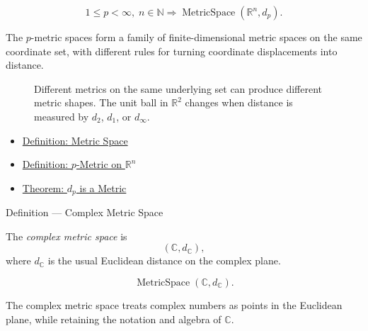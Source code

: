 \begin{remark*}
\[
1\leq p<\infty,\; n\in\mathbb{N}
\Longrightarrow
\operatorname{MetricSpace}(\mathbb{R}^n,d_p).
\]
\end{remark*}

\begin{remark*}[Interpretation]
The \(p\)-metric spaces form a family of finite-dimensional metric spaces on
the same coordinate set, with different rules for turning coordinate
displacements into distance.
\end{remark*}

\begin{figure}[htbp]
\centering

\caption{Different metrics on the same underlying set can produce different
metric shapes.  The unit ball in \(\mathbb{R}^2\) changes when distance is
measured by \(d_2\), \(d_1\), or \(d_\infty\).}
\label{fig:metric-unit-balls-r2}
\end{figure}

\begin{dependencies}
\begin{itemize}
  \item \hyperref[def:metric-space]{Definition: Metric Space}
  \item \hyperref[def:lp-metric-rn]{Definition: \(p\)-Metric on \(\mathbb{R}^n\)}
  \item \hyperref[thm:lp-metric-rn]{Theorem: \(d_p\) is a Metric}
\end{itemize}
\end{dependencies}

\begin{definitionbox}{Definition --- Complex Metric Space}
\begin{definition}\label{def:complex-metric-space}
The \emph{complex metric space} is
\[
  (\mathbb{C},d_{\mathbb{C}}),
\]
where \(d_{\mathbb{C}}\) is the usual Euclidean distance on the complex plane.
\end{definition}
\end{definitionbox}

\begin{remark*}
\[
\operatorname{MetricSpace}(\mathbb{C},d_{\mathbb{C}}).
\]
\end{remark*}

\begin{remark*}[Interpretation]
The complex metric space treats complex numbers as points in the Euclidean
plane, while retaining the notation and algebra of \(\mathbb{C}\).
\end{remark*}

